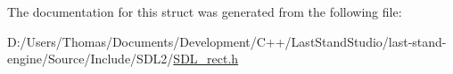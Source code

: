 The documentation for this struct was generated from the following file\+:\begin{DoxyCompactItemize}
\item 
D\+:/\+Users/\+Thomas/\+Documents/\+Development/\+C++/\+Last\+Stand\+Studio/last-\/stand-\/engine/\+Source/\+Include/\+S\+D\+L2/\hyperlink{SDL__rect_8h}{S\+D\+L\+\_\+rect.\+h}\end{DoxyCompactItemize}
